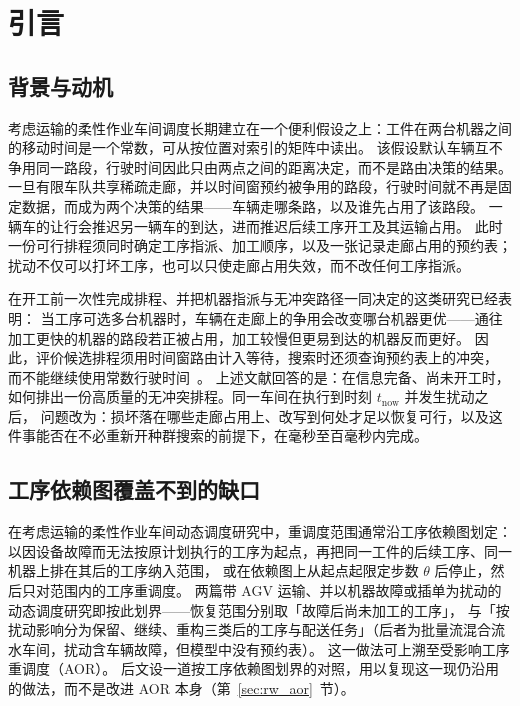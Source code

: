\documentclass[manuscript,screen,review]{acmart}
\begin{document}
\maketitle

\section{引言}
\label{sec:introduction}

\subsection{背景与动机}

考虑运输的柔性作业车间调度长期建立在一个便利假设之上：工件在两台机器之间的移动时间是一个常数，可从按位置对索引的矩阵中读出。
该假设默认车辆互不争用同一路段，行驶时间因此只由两点之间的距离决定，而不是路由决策的结果。
一旦有限车队共享稀疏走廊，并以时间窗预约被争用的路段，行驶时间就不再是固定数据，而成为两个决策的结果——车辆走哪条路，以及谁先占用了该路段。
一辆车的让行会推迟另一辆车的到达，进而推迟后续工序开工及其运输占用。
此时一份可行排程须同时确定工序指派、加工顺序，以及一张记录走廊占用的预约表；扰动不仅可以打坏工序，也可以只使走廊占用失效，而不改任何工序指派。

在开工前一次性完成排程、并把机器指派与无冲突路径一同决定的这类研究已经表明：
当工序可选多台机器时，车辆在走廊上的争用会改变哪台机器更优——通往加工更快的机器的路段若正被占用，加工较慢但更易到达的机器反而更好。
因此，评价候选排程须用时间窗路由计入等待，搜索时还须查询预约表上的冲突，
而不能继续使用常数行驶时间~\cite{vanos2026exact,li2026framework,sun2023integrated}。
上述文献回答的是：在信息完备、尚未开工时，如何排出一份高质量的无冲突排程。同一车间在执行到时刻 \(t_{\mathrm{now}}\) 并发生扰动之后，
问题改为：损坏落在哪些走廊占用上、改写到何处才足以恢复可行，以及这件事能否在不必重新开种群搜索的前提下，在毫秒至百毫秒内完成。

\subsection{工序依赖图覆盖不到的缺口}

在考虑运输的柔性作业车间动态调度研究中，重调度范围通常沿工序依赖图划定：以因设备故障而无法按原计划执行的工序为起点，再把同一工件的后续工序、同一机器上排在其后的工序纳入范围，
或在依赖图上从起点起限定步数 \(\theta\) 后停止，然后只对范围内的工序重调度。
两篇带 AGV 运输、并以机器故障或插单为扰动的动态调度研究即按此划界——恢复范围分别取「故障后尚未加工的工序」\cite{zhang2023energy}，
与「按扰动影响分为保留、继续、重构三类后的工序与配送任务」\cite{tang2026dynamic}（后者为批量流混合流水车间，扰动含车辆故障，但模型中没有预约表）。
这一做法可上溯至受影响工序重调度（AOR）\cite{zhang2023energy,tang2026dynamic}。
后文设一道按工序依赖图划界的对照，用以复现这一现仍沿用的做法，而不是改进 AOR 本身（第~\ref{sec:rw_aor}~节）。
\end{document}

